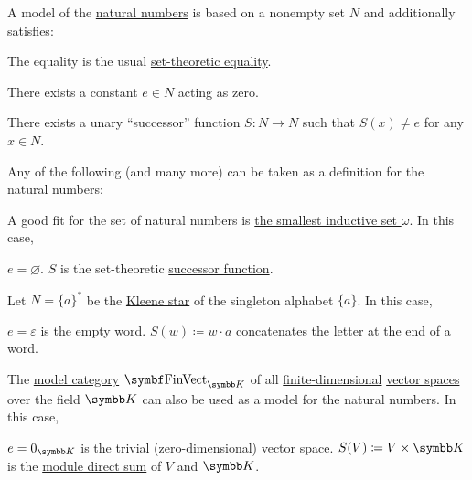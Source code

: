 \begin{example}\label{ex:natural_numbers_models}
  A model of the \hyperref[def:natural_numbers]{natural numbers} is based on a nonempty set \( N \) and additionally satisfies:
  \begin{RefList}
     The equality is the usual \hyperref[def:set_zfc]{set-theoretic equality}.

     There exists a constant \( e \in N \) acting as zero.

     There exists a unary \enquote{successor} function \( S: N \to N \) such that \( S(x) \neq e \) for any \( x \in N \).
  \end{RefList}

  Any of the following (and many more) can be taken as a definition for the natural numbers:
  \begin{DefEnum}
     A good fit for the set of natural numbers is \hyperref[def:smallest_inductive_set]{the smallest inductive set \( \omega \)}. In this case,
    \begin{RefList}
       \( e = \varnothing \).
       \( S \) is the set-theoretic \hyperref[def:successor_operator]{successor function}.
    \end{RefList}

     Let \( N = \{ a \}^{*} \) be the \hyperref[def:language]{Kleene star} of the singleton alphabet \( \{ a \} \). In this case,
    \begin{RefList}
       \( e = \varepsilon \) is the empty word.
       \( S(w) \coloneqq w \cdot a \) concatenates the letter at the end of a word.
    \end{RefList}

     The \hyperref[def:first_order_model_category]{model category} \( \Cat{FinVect}_{\BK} \) of all \hyperref[def:vector_space_dimension]{finite-dimensional} \hyperref[def:vector_space]{vector spaces} over the field \( \BK \) can also be used as a model for the natural numbers. In this case,
    \begin{RefList}
       \( e = 0_{\BK} \) is the trivial (zero-dimensional) vector space.
       \( S(V) \coloneqq V \times \BK \) is the \hyperref[def:left_module_direct_product]{module direct sum} of \( V \) and \( \BK \).
    \end{RefList}
  \end{DefEnum}
\end{example}

